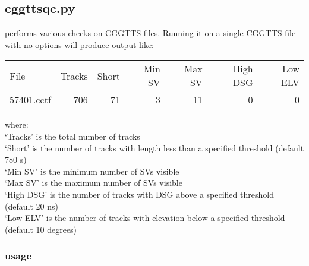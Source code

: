 \subsection{cggttsqc.py}

\hypertarget{h:cggttsqc}{}

 performs various checks on CGGTTS files.
Running it on a single CGGTTS file with no options will produce output like:

\begin{tabular}{lrrrrrr}
File         & Tracks  & Short & Min SV & Max SV   &  High DSG  &  Low ELV \\
57401.cctf   &   706   &  71   &   3    &  11      & 0     &  0   \\
\end{tabular}

where:\\
`Tracks' is the total number of tracks\\
`Short'  is the number of tracks with length less than a specified threshold (default 780 s)\\
`Min SV' is the minimum number of SVs visible\\
`Max SV' is the maximum number of SVs visible \\
`High DSG'    is the number of tracks with DSG above a specified threshold (default 20 ns)\\
`Low ELV'    is the number of tracks with elevation below a specified threshold (default 10 degrees)\\

\subsubsection{usage}

